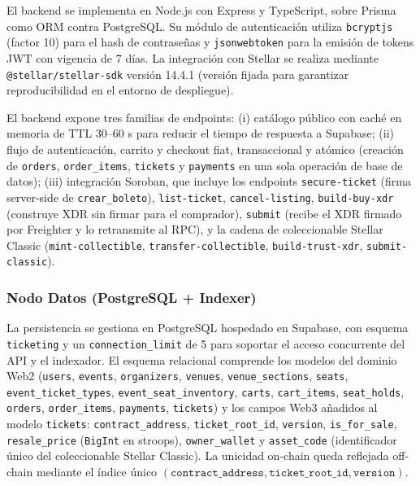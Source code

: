 El backend se implementa en Node.js con Express y TypeScript, sobre Prisma como ORM contra PostgreSQL. Su módulo de autenticación utiliza \texttt{bcryptjs} (factor 10) para el hash de contraseñas y \texttt{jsonwebtoken} para la emisión de tokens JWT con vigencia de 7 días. La integración con Stellar se realiza mediante \texttt{@stellar/stellar-sdk} versión 14.4.1 (versión fijada para garantizar reproducibilidad en el entorno de despliegue).

El backend expone tres familias de endpoints: (i) catálogo público con caché en memoria de TTL 30–60 s para reducir el tiempo de respuesta a Supabase; (ii) flujo de autenticación, carrito y checkout fiat, transaccional y atómico (creación de \texttt{orders}, \texttt{order\_items}, \texttt{tickets} y \texttt{payments} en una sola operación de base de datos); (iii) integración Soroban, que incluye los endpoints \texttt{secure-ticket} (firma server-side de \texttt{crear\_boleto}), \texttt{list-ticket}, \texttt{cancel-listing}, \texttt{build-buy-xdr} (construye XDR sin firmar para el comprador), \texttt{submit} (recibe el XDR firmado por Freighter y lo retransmite al RPC), y la cadena de coleccionable Stellar Classic (\texttt{mint-collectible}, \texttt{transfer-collectible}, \texttt{build-trust-xdr}, \texttt{submit-classic}).

\subsubsection{Nodo Datos (PostgreSQL + Indexer)}

La persistencia se gestiona en PostgreSQL hospedado en Supabase, con esquema \texttt{ticketing} y un \texttt{connection\_limit} de 5 para soportar el acceso concurrente del API y el indexador. El esquema relacional comprende los modelos del dominio Web2 (\texttt{users}, \texttt{events}, \texttt{organizers}, \texttt{venues}, \texttt{venue\_sections}, \texttt{seats}, \texttt{event\_ticket\_types}, \texttt{event\_seat\_inventory}, \texttt{carts}, \texttt{cart\_items}, \texttt{seat\_holds}, \texttt{orders}, \texttt{order\_items}, \texttt{payments}, \texttt{tickets}) y los campos Web3 añadidos al modelo \texttt{tickets}: \texttt{contract\_address}, \texttt{ticket\_root\_id}, \texttt{version}, \texttt{is\_for\_sale}, \texttt{resale\_price} (\texttt{BigInt} en stroops), \texttt{owner\_wallet} y \texttt{asset\_code} (identificador único del coleccionable Stellar Classic). La unicidad on-chain queda reflejada off-chain mediante el índice único \((\texttt{contract\_address}, \texttt{ticket\_root\_id}, \texttt{version})\).

